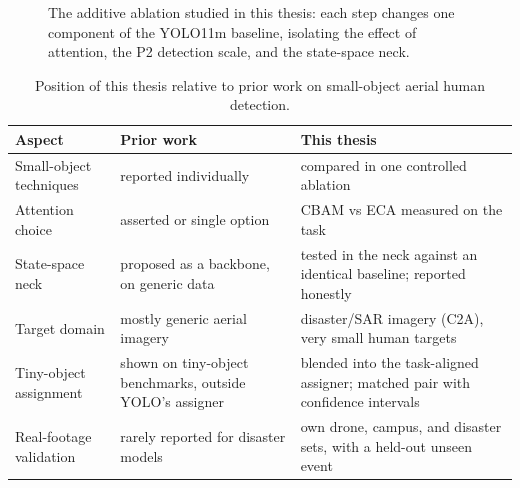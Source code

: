 \begin{figure}[tbp]
  \centering
  \caption{The additive ablation studied in this thesis: each step changes one
  component of the YOLO11m baseline, isolating the effect of attention, the P2
  detection scale, and the state-space neck.}
  \label{fig:chain}
\end{figure}

\begin{table}[tbp]
  \centering
  \caption{Position of this thesis relative to prior work on small-object aerial
  human detection.}
  \label{tab:gap}
  \begin{tabular}{@{}p{4.2cm} p{5cm} p{5cm}@{}}
    \toprule
    Aspect & Prior work & This thesis \\
    \midrule
    Small-object techniques & reported individually & compared in one controlled ablation \\
    Attention choice & asserted or single option & CBAM vs ECA measured on the task \\
    State-space neck & proposed as a backbone, on generic data & tested in the neck against an identical baseline; reported honestly \\
    Target domain & mostly generic aerial imagery & disaster/SAR imagery (C2A), very small human targets \\
    Tiny-object assignment & shown on tiny-object benchmarks, outside YOLO's assigner & blended into the task-aligned assigner; matched pair with confidence intervals \\
    Real-footage validation & rarely reported for disaster models & own drone, campus, and disaster sets, with a held-out unseen event \\
    \bottomrule
  \end{tabular}
\end{table}

